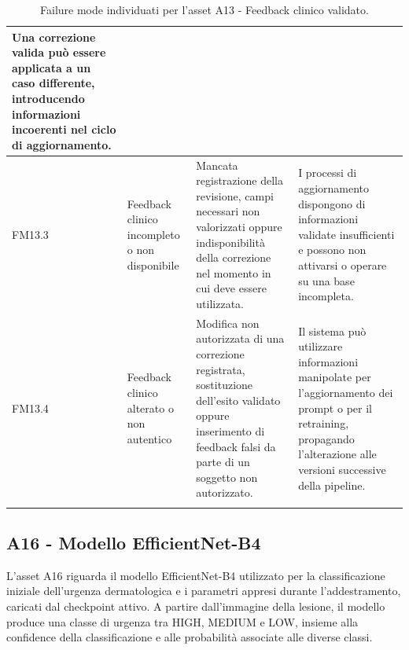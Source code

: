 {\begin{xltabular}{\textwidth}{
    >{\raggedright\arraybackslash}p{1.1cm}
    >{\raggedright\arraybackslash}p{3cm}
    >{\raggedright\arraybackslash}p{5cm}
    X
}
Una correzione valida può essere applicata a un caso differente,
introducendo informazioni incoerenti nel ciclo di aggiornamento. \\

\midrule


FM13.3 &

Feedback clinico incompleto o non disponibile &

Mancata registrazione della revisione, campi necessari non
valorizzati oppure indisponibilità della correzione nel momento
in cui deve essere utilizzata. &

I processi di aggiornamento dispongono di informazioni validate
insufficienti e possono non attivarsi o operare su una base
incompleta. \\

\midrule


FM13.4 \hypertarget{fm13-4}{} &

Feedback clinico alterato o non autentico &

Modifica non autorizzata di una correzione registrata, sostituzione
dell'esito validato oppure inserimento di feedback falsi da parte
di un soggetto non autorizzato. &

Il sistema può utilizzare informazioni manipolate per
l'aggiornamento dei prompt o per il retraining, propagando
l'alterazione alle versioni successive della pipeline. \\

\bottomrule

\caption{Failure mode individuati per l'asset A13 - Feedback clinico validato.}
\label{tab:a13-failure-modes}\\

\end{xltabular}
}


\subsection{A16 - Modello EfficientNet-B4}

L'asset A16 riguarda il modello EfficientNet-B4 utilizzato per la
classificazione iniziale dell'urgenza dermatologica e i parametri appresi
durante l'addestramento, caricati dal checkpoint attivo. A partire
dall'immagine della lesione, il modello produce una classe di urgenza
tra HIGH, MEDIUM e LOW, insieme alla confidence della classificazione e
alle probabilità associate alle diverse classi.

